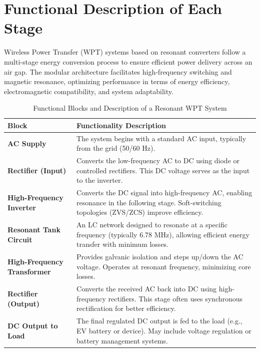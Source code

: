 \documentclass[12pt,a4paper]{report}
\begin{document}
\section{Functional Description of Each Stage}
\quad Wireless Power Transfer (WPT) systems based on resonant converters follow a multi-stage energy conversion process to ensure efficient power delivery across an air gap. The modular architecture facilitates high-frequency switching and magnetic resonance, optimizing performance in terms of energy efficiency, electromagnetic compatibility, and system adaptability.\cite{irivennela2020wireless}


\begin{table}[H]
\centering
\renewcommand{\arraystretch}{1.3}
\begin{tabular}{|p{4.5cm}|p{10.5cm}|}
\hline
\textbf{Block} & \textbf{Functionality Description} \\
\hline
\textbf{AC Supply} & The system begins with a standard AC input, typically from the grid (50/60 Hz). \\
\hline
\textbf{Rectifier (Input)} & Converts the low-frequency AC to DC using diode or controlled rectifiers. This DC voltage serves as the input to the inverter. \\
\hline
\textbf{High-Frequency Inverter} & Converts the DC signal into high-frequency AC, enabling resonance in the following stage. Soft-switching topologies (ZVS/ZCS) improve efficiency. \\
\hline
\textbf{Resonant Tank Circuit} & An LC network designed to resonate at a specific frequency (typically 6.78 MHz), allowing efficient energy transfer with minimum losses. \\
\hline
\textbf{High-Frequency Transformer} & Provides galvanic isolation and steps up/down the AC voltage. Operates at resonant frequency, minimizing core losses. \\
\hline
\textbf{Rectifier (Output)} & Converts the received AC back into DC using high-frequency rectifiers. This stage often uses synchronous rectification for better efficiency. \\
\hline
\textbf{DC Output to Load} & The final regulated DC output is fed to the load (e.g., EV battery or device). May include voltage regulation or battery management systems. \\
\hline
\end{tabular}
\caption{Functional Blocks and Description of a Resonant WPT System}
\label{tab:WPT_block_functionality}
\end{table}
\end{document}
